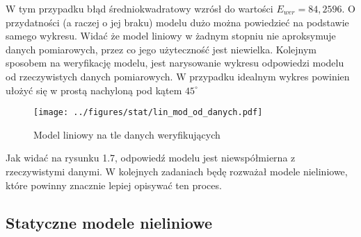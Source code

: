\documentclass[a4paper,titlepage,11pt,floatssmall]{mwrep}
\begin{document}
W tym przypadku błąd średniokwadratowy wzrósł do wartości $E_{wer} = 84,2596$. O przydatności (a raczej o jej braku) modelu dużo można powiedzieć na podstawie samego wykresu. Widać że model liniowy w żadnym stopniu nie aproksymuje danych pomiarowych, przez co jego użyteczność jest niewielka.  
\newpage 
Kolejnym sposobem na weryfikację modelu, jest narysowanie wykresu odpowiedzi modelu od rzeczywistych danych pomiarowych. W przypadku idealnym wykres powinien ułożyć się w prostą nachyloną pod kątem $45^{\circ}$
\begin{figure}[H]
\centering
\texttt{[image: ../figures/stat/lin\_mod\_od\_danych.pdf]}
\caption{Model liniowy na tle danych weryfikujących}
\end{figure}
Jak widać na rysunku 1.7, odpowiedź modelu jest niewspółmierna z rzeczywistymi danymi. W kolejnych zadaniach będę rozważał modele nieliniowe, które powinny znacznie lepiej opisywać ten proces.

\subsection{Statyczne modele nieliniowe}
\end{document}
